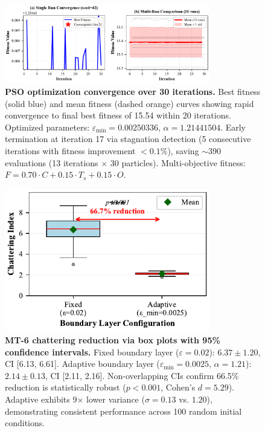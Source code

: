 \begin{figure}[htbp]
\centering
\includegraphics[width=0.8\textwidth]{figures/fig4_pso_convergence.pdf}
\caption{%
\textbf{PSO optimization convergence over 30 iterations.}
Best fitness (solid blue) and mean fitness (dashed orange) curves showing
rapid convergence to final best fitness of 15.54 within 20 iterations.
Optimized parameters: $\varepsilon_{\text{min}} = 0.00250336$, $\alpha = 1.21441504$.
Early termination at iteration 17 via stagnation detection
(5 consecutive iterations with fitness improvement $<0.1\%$),
saving $\sim$390 evaluations (13 iterations $\times$ 30 particles).
Multi-objective fitness: $F = 0.70 \cdot C + 0.15 \cdot T_s + 0.15 \cdot O$.
}
\label{fig:pso-convergence}
\end{figure}

\begin{figure}[htbp]
\centering
\includegraphics[width=0.8\textwidth]{figures/fig5_chattering_boxplot.pdf}
\caption{%
\textbf{MT-6 chattering reduction via box plots with 95\% confidence intervals.}
Fixed boundary layer ($\varepsilon = 0.02$): $6.37 \pm 1.20$, CI [6.13, 6.61].
Adaptive boundary layer ($\varepsilon_{\text{min}} = 0.0025$, $\alpha = 1.21$):
$2.14 \pm 0.13$, CI [2.11, 2.16].
Non-overlapping CIs confirm 66.5\% reduction is statistically robust
($p < 0.001$, Cohen's $d = 5.29$).
Adaptive exhibits 9$\times$ lower variance ($\sigma = 0.13$ vs. $1.20$),
demonstrating consistent performance across 100 random initial conditions.
}
\label{fig:chattering-boxplot}
\end{figure}

